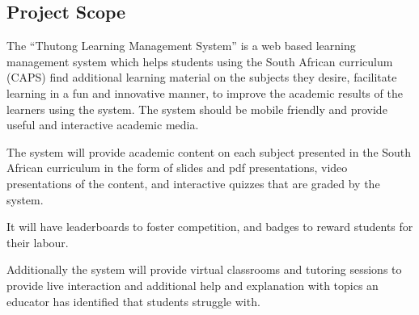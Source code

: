 \documentclass[12pt,a4paper]{article}
\begin{document}
		\subsection*{Project Scope}
			\begin{description}
				\item The “Thutong Learning Management System” is a web based learning management system which helps students using the South African curriculum (CAPS) find additional learning material on the subjects they
desire, facilitate learning in a fun and innovative manner, to improve the academic results of the learners using the system. The system should be mobile friendly and provide useful and interactive academic media.
				\item The system will provide academic content on each subject presented in the South African curriculum in the form of slides and pdf presentations, video presentations of the content, and interactive quizzes that are graded by the system. 
				\item It will have leaderboards to foster
competition, and badges to reward students for their labour.
				\item Additionally the system will provide virtual classrooms and tutoring sessions to provide live interaction and additional help and explanation  with topics an educator has identified that students struggle with.
			\end{description}
			
\end{document}
